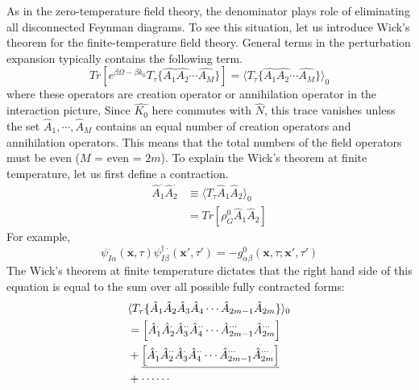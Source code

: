 As in the zero-temperature field theory, the denominator plays role of eliminating all disconnected Feynman diagrams.
To see this situation, let us introduce Wick's theorem for the finite-temperature field theory.
General terms in the perturbation expansion typically contains the following term.
\begin{equation}
Tr\left[e^{\beta\Omega-\beta k_0}T_\tau\{\hat{A_1}\hat{A_2}\cdots\hat{A_M}\}\right]=\langle T_\tau\{\hat{A_1}\hat{A_2}\cdots\hat{A_M}\}\rangle_0
\end{equation}
where these operators are creation operator or annihilation operator in the interaction picture,
Since $\hat{K_0}$ here commutes with $\hat{N}$, this trace vanishes unless the set $\hat{A}_1,\cdots,\hat{A}_M$ contains an equal number of creation operators and annihilation operators.
This means that the total numbers of the field operators must be even ($M$ = even = $2m$).
To explain the Wick's theorem at finite temperature, let us first define a contraction.
\begin{equation}\label{4.3.A}
\begin{aligned}
\hat{A}_{1}^\cdotp \hat{A}_{2}^\cdot & \equiv \langle T_{\tau} \hat{A}_{1} \hat{A}_{2} \rangle_{0}\\
&=Tr[\rho_G^0\hat{A}_1\hat{A}_2]
\end{aligned}
\end{equation}
For example,
\begin{equation}
\psi_{I\alpha}^{\cdotp}(\mathbf{x},\tau) \psi_{I\beta}^{\dagger\cdotp}(\mathbf{x'},\tau')=-g_{\alpha\beta}^0(\mathbf{x},\tau;\mathbf{x'},\tau')
\end{equation}
The Wick's theorem at finite temperature dictates that the right hand side of this equation is equal to the sum over all possible fully contracted forms:
\begin{equation}
\begin{aligned}
&\langle T_\tau\{ \hat{A}_1\hat{A}_2\hat{A}_3\hat{A}_4\cdots \hat{A}_{2m-1}\hat{A}_{2m}\}\rangle_0\\
&=\left[\hat{A}_1^{\cdot} \hat{A}_2^{\cdot} \hat{A}_3^{\cdot\cdot} \hat{A}_4^{\cdot\cdot} \cdots \hat{A}_{2m-1}^{\cdots} \hat{A}_{2m}^{\cdots} \right]\\
&+\uline{\left[\hat{A}_1^\cdot\hat{A}_2^{\cdot\cdot}\hat{A}_3^\cdot\hat{A}_4^{\cdot\cdot}\cdots\hat{A}_{2m-1}^{\cdots}\hat{A}_{2m}^{\cdots}\right]}\\
&+\cdots\cdots
\end{aligned}
\end{equation}
